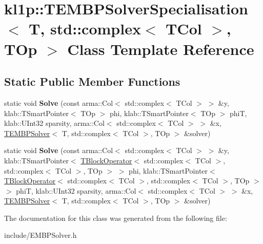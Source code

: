 \hypertarget{classkl1p_1_1TEMBPSolverSpecialisation_3_01T_00_01std_1_1complex_3_01TCol_01_4_00_01TOp_01_4}{}\section{kl1p\+:\+:T\+E\+M\+B\+P\+Solver\+Specialisation$<$ T, std\+:\+:complex$<$ T\+Col $>$, T\+Op $>$ Class Template Reference}
\label{classkl1p_1_1TEMBPSolverSpecialisation_3_01T_00_01std_1_1complex_3_01TCol_01_4_00_01TOp_01_4}
\subsection*{Static Public Member Functions}
\begin{DoxyCompactItemize}
\item 
static void {\bfseries Solve} (const arma\+::\+Col$<$ std\+::complex$<$ T\+Col $>$ $>$ \&y, klab\+::\+T\+Smart\+Pointer$<$ T\+Op $>$ phi, klab\+::\+T\+Smart\+Pointer$<$ T\+Op $>$ phiT, klab\+::\+U\+Int32 sparsity, arma\+::\+Col$<$ std\+::complex$<$ T\+Col $>$ $>$ \&x, \hyperlink{classkl1p_1_1TEMBPSolver}{T\+E\+M\+B\+P\+Solver}$<$ T, std\+::complex$<$ T\+Col $>$, T\+Op $>$ \&solver)\hypertarget{classkl1p_1_1TEMBPSolverSpecialisation_3_01T_00_01std_1_1complex_3_01TCol_01_4_00_01TOp_01_4_a7ebf7d6db32efd8c4a6a2b2f8101816f}{}\label{classkl1p_1_1TEMBPSolverSpecialisation_3_01T_00_01std_1_1complex_3_01TCol_01_4_00_01TOp_01_4_a7ebf7d6db32efd8c4a6a2b2f8101816f}

\item 
static void {\bfseries Solve} (const arma\+::\+Col$<$ std\+::complex$<$ T\+Col $>$ $>$ \&y, klab\+::\+T\+Smart\+Pointer$<$ \hyperlink{classkl1p_1_1TBlockOperator}{T\+Block\+Operator}$<$ std\+::complex$<$ T\+Col $>$, std\+::complex$<$ T\+Col $>$, T\+Op $>$ $>$ phi, klab\+::\+T\+Smart\+Pointer$<$ \hyperlink{classkl1p_1_1TBlockOperator}{T\+Block\+Operator}$<$ std\+::complex$<$ T\+Col $>$, std\+::complex$<$ T\+Col $>$, T\+Op $>$ $>$ phiT, klab\+::\+U\+Int32 sparsity, arma\+::\+Col$<$ std\+::complex$<$ T\+Col $>$ $>$ \&x, \hyperlink{classkl1p_1_1TEMBPSolver}{T\+E\+M\+B\+P\+Solver}$<$ T, std\+::complex$<$ T\+Col $>$, T\+Op $>$ \&solver)\hypertarget{classkl1p_1_1TEMBPSolverSpecialisation_3_01T_00_01std_1_1complex_3_01TCol_01_4_00_01TOp_01_4_aae94923cf7747cf17b64ee78d44fe25f}{}\label{classkl1p_1_1TEMBPSolverSpecialisation_3_01T_00_01std_1_1complex_3_01TCol_01_4_00_01TOp_01_4_aae94923cf7747cf17b64ee78d44fe25f}

\end{DoxyCompactItemize}


The documentation for this class was generated from the following file\+:\begin{DoxyCompactItemize}
\item 
include/E\+M\+B\+P\+Solver.\+h\end{DoxyCompactItemize}
